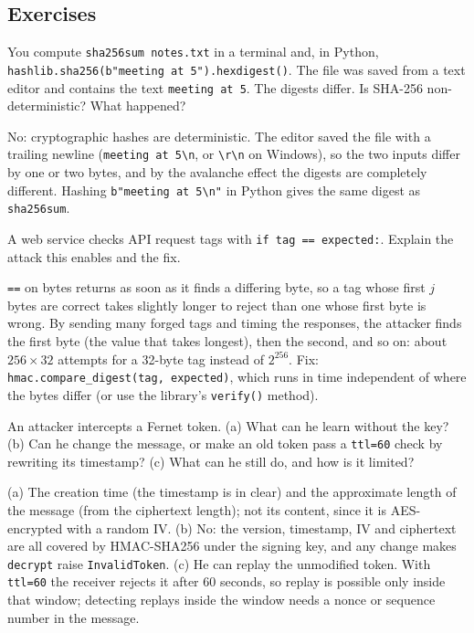 \subsection*{Exercises}

\begin{exercise}
You compute \texttt{sha256sum notes.txt} in a terminal and, in Python, \texttt{hashlib.\allowbreak sha256(b"meeting at 5").\allowbreak hexdigest()}. The file was saved from a text editor and contains the text \texttt{meeting at 5}. The digests differ. Is SHA-256 non-deterministic? What happened?
\end{exercise}
\begin{solution}
No: cryptographic hashes are deterministic. The editor saved the file with a trailing newline (\texttt{meeting at 5\textbackslash n}, or \texttt{\textbackslash r\textbackslash n} on Windows), so the two inputs differ by one or two bytes, and by the avalanche effect the digests are completely different. Hashing \texttt{b"meeting at 5\textbackslash n"} in Python gives the same digest as \texttt{sha256sum}.
\end{solution}

\begin{exercise}
A web service checks API request tags with \texttt{if tag == expected:}. Explain the attack this enables and the fix.
\end{exercise}
\begin{solution}
\texttt{==} on bytes returns as soon as it finds a differing byte, so a tag whose first $j$ bytes are correct takes slightly longer to reject than one whose first byte is wrong. By sending many forged tags and timing the responses, the attacker finds the first byte (the value that takes longest), then the second, and so on: about $256 \times 32$ attempts for a 32-byte tag instead of $2^{256}$. Fix: \texttt{hmac.compare\_digest(tag, expected)}, which runs in time independent of where the bytes differ (or use the library's \texttt{verify()} method).
\end{solution}

\begin{exercise}
An attacker intercepts a Fernet token. (a) What can he learn without the key? (b) Can he change the message, or make an old token pass a \texttt{ttl=60} check by rewriting its timestamp? (c) What can he still do, and how is it limited?
\end{exercise}
\begin{solution}
(a) The creation time (the timestamp is in clear) and the approximate length of the message (from the ciphertext length); not its content, since it is AES-encrypted with a random IV. (b) No: the version, timestamp, IV and ciphertext are all covered by HMAC-SHA256 under the signing key, and any change makes \texttt{decrypt} raise \texttt{InvalidToken}. (c) He can replay the unmodified token. With \texttt{ttl=60} the receiver rejects it after 60 seconds, so replay is possible only inside that window; detecting replays inside the window needs a nonce or sequence number in the message.
\end{solution}

